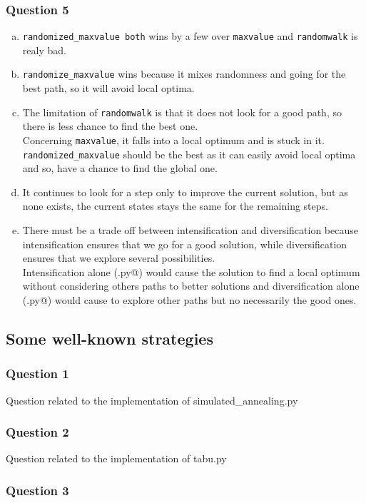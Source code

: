 \documentclass[a4paper,10pt]{article}
\begin{document}
\subsubsection{Question 5}
	\begin{enumerate}[(a)]
		\item \texttt{randomized\_maxvalue both} wins by a few over \texttt{maxvalue} and \texttt{randomwalk} is realy bad.
		\item \texttt{randomize\_maxvalue} wins because it mixes randomness and going for the best path, so it will avoid local optima.
		\item The limitation of \texttt{randomwalk} is that it does not look for a good path, so there is less chance to find the best one.\\
		Concerning \texttt{maxvalue}, it falls into a local optimum and is stuck in it.
		\texttt{randomized\_maxvalue} should be the best as it can easily avoid local optima and so, have a chance to find the global one.
		\item It continues to look for a step only to improve the current solution, but as none exists, the current states stays the same for the remaining steps.
		\item There must be a trade off between intensification and diversification because intensification ensures that we go for a good solution, while diversification ensures that we explore several possibilities. \\
		Intensification alone (\verb@maxvalue.py@) would cause the solution to find a local optimum without considering others paths to better solutions and diversification alone (\verb@randomwalk.py@) would cause to explore other paths but no necessarily the good ones.
	\end{enumerate}

\subsection{Some well-known strategies}
\subsubsection{Question 1}
	Question related to the implementation of simulated\_annealing.py
\subsubsection{Question 2}
	Question related to the implementation of tabu.py
\subsubsection{Question 3}
\end{document}
